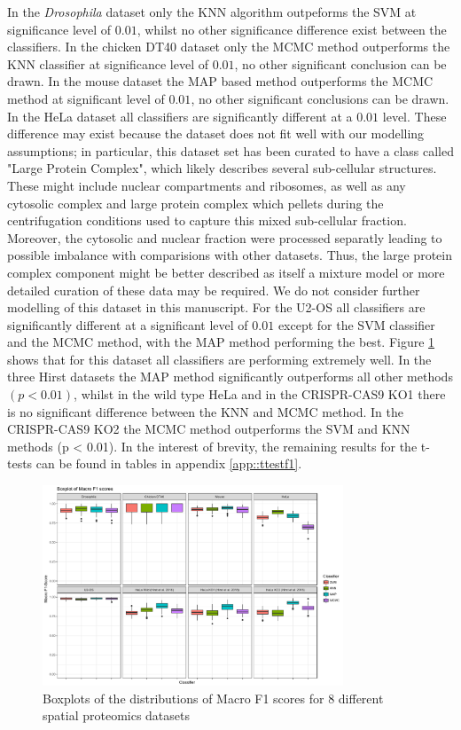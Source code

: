 \documentclass[12pt,english]{article}\usepackage[]{graphicx}\usepackage[]{color}
\begin{document}
In the \textit{Drosophila} dataset only the KNN algorithm outpeforms
the SVM at significance level of $0.01$, whilst no other significance
difference exist between the classifiers. In the chicken DT40 dataset
only the MCMC method outperforms the KNN classifier at significance
level of $0.01$, no other significant conclusion can be drawn. In the
mouse dataset the MAP based method outperforms the MCMC method at
significant level of $0.01$, no other significant conclusions can be
drawn. In the HeLa dataset all classifiers are significantly different
at a $0.01$ level. These difference may exist because the dataset does
not fit well with our modelling assumptions; in particular, this
dataset set has been curated to have a class called "Large Protein
Complex", which likely describes several sub-cellular
structures. These might include nuclear compartments and ribosomes, as
well as any cytosolic complex and large protein complex which pellets
during the centrifugation conditions used to capture this mixed
sub-cellular fraction. Moreover, the cytosolic and nuclear fraction
were processed separatly leading to possible imbalance with
comparisions with other datasets. Thus, the large protein complex
component might be better described as itself a mixture model or more
detailed curation of these data may be required. We do not consider
further modelling of this dataset in this manuscript. For the U2-OS
all classifiers are significantly different at a significant level of
$0.01$ except for the SVM classifier and the MCMC method, with the MAP
method performing the best. Figure \ref{figure::f1scores1} shows that
for this dataset all classifiers are performing extremely well. In the
three Hirst datasets the MAP method significantly outperforms all
other methods $(p < 0.01)$, whilst in the wild type HeLa and in the
CRISPR-CAS9 KO1 there is no significant difference between the KNN
and MCMC method. In the CRISPR-CAS9 KO2 the MCMC method outperforms
the SVM and KNN methods (p < 0.01). In the interest of brevity, the
remaining results for the t-tests can be found in tables in appendix
\ref{app::ttestf1}.




\begin{figure}[ht]
  \centering
\includegraphics[width=0.8\textwidth]{F1compare1.pdf}
  \caption{Boxplots of the distributions of Macro F1 scores
    for 8 different spatial proteomics datasets}
  \label{figure::f1scores1}
\end{figure}
\end{document}
